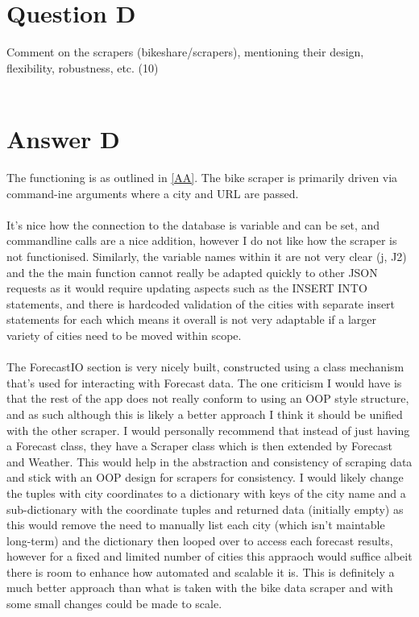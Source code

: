 \documentclass{scrreprt}
\begin{document}
\pagebreak
\section{Question D}\label{QD}
Comment on the scrapers (bikeshare/scrapers), mentioning their design, flexibility, robustness, etc. (10)\\
\\

\section{Answer D}\label{AD}
The functioning is as outlined in \ref{AA}. The bike scraper is primarily driven via command-ine arguments where a city and URL are passed.\\
\\
It's nice how the connection to the database is variable and can be set, and commandline calls are a nice addition, however I do not like how the scraper is not functionised. Similarly, the variable names within it are not very clear (j, J2) and the the main function cannot really be adapted quickly to other JSON requests as it would require updating aspects such as the INSERT INTO statements, and there is hardcoded validation of the cities with separate insert statements for each which means it overall is not very adaptable if a larger variety of cities need to be moved within scope.\\
\\
The ForecastIO  section is very nicely built, constructed using a class mechanism that's used for interacting with Forecast data. The one criticism I would have is that the rest of the app does not really conform to using an OOP style structure, and as such although this is likely a better approach I think it should be unified with the other scraper. I would personally recommend that instead of just having a Forecast class, they have a Scraper class which is then extended by Forecast and Weather. This would help in the abstraction and consistency of scraping data and stick with an OOP design for scrapers for consistency.  I would likely change the tuples with city coordinates to a dictionary with keys of the city name and a sub-dictionary with the coordinate tuples and returned data (initially empty) as this would remove the need to manually list each city (which isn't maintable long-term) and the dictionary then looped over to access each forecast results, however for a fixed and limited number of cities this appraoch would suffice albeit there is room to enhance how automated and scalable it is. This is definitely a much better approach than what is taken with the bike data scraper and with some small changes could be made to scale.\\
\\
\end{document}
